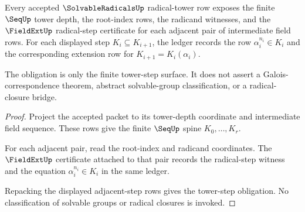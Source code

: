\begin{theorem}
\label{thm:solvableradicals-tower-step-obligation}
Every accepted $\SolvableRadicalsUp$ radical-tower row exposes the finite
$\SeqUp$ tower depth, the root-index rows, the radicand witnesses, and the
$\FieldExtUp$ radical-step certificate for each adjacent pair of intermediate
field rows. For each displayed step $K_i\subseteq K_{i+1}$, the ledger records
the row $\alpha_i^{n_i}\in K_i$ and the corresponding extension row for
$K_{i+1}=K_i(\alpha_i)$.

The obligation is only the finite tower-step surface. It does not assert a
Galois-correspondence theorem, abstract solvable-group classification, or a
radical-closure bridge.
\end{theorem}
\begin{proof}
Project the accepted packet to its tower-depth coordinate and intermediate
field sequence. These rows give the finite $\SeqUp$ spine
$K_0,\ldots,K_r$.

For each adjacent pair, read the root-index and radicand coordinates. The
$\FieldExtUp$ certificate attached to that pair records the radical-step
witness and the equation $\alpha_i^{n_i}\in K_i$ in the same ledger.

Repacking the displayed adjacent-step rows gives the tower-step obligation.
No classification of solvable groups or radical closures is invoked.
\end{proof}

